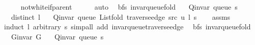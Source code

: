 \begin{isabellebody}
\ \ \ \ \isamarkupfalse%
\ not{\isacharunderscore}{\kern0pt}white{\isacharunderscore}{\kern0pt}if{\isacharunderscore}{\kern0pt}parent\isanewline
\ \ \ \ \isamarkupfalse%
\ auto\isanewline
{}\isamarkupfalse%
%
\endisatagproof
{\isafoldproof}%
%
\isadelimproof
\isanewline
%
\endisadelimproof
%
\isadeliminvisible
\isanewline
%
\endisadeliminvisible
%
\isataginvisible
{}\isamarkupfalse%
\ {\isacharparenleft}{\kern0pt}\ bfs{\isacharparenright}{\kern0pt}\ invar{\isacharunderscore}{\kern0pt}queue{\isacharunderscore}{\kern0pt}fold{\isacharcolon}{\kern0pt}\isanewline
\ \ \ {\isachardoublequoteopen}Q{\isacharunderscore}{\kern0pt}invar\ {\isacharparenleft}{\kern0pt}queue\ s{\isacharparenright}{\kern0pt}{\isachardoublequoteclose}\isanewline
\ \ \ {\isachardoublequoteopen}distinct\ l{\isachardoublequoteclose}\isanewline
\ \ \ {\isachardoublequoteopen}Q{\isacharunderscore}{\kern0pt}invar\ {\isacharparenleft}{\kern0pt}queue\ {\isacharparenleft}{\kern0pt}List{\isachardot}{\kern0pt}fold\ {\isacharparenleft}{\kern0pt}traverse{\isacharunderscore}{\kern0pt}edge\ src\ u{\isacharparenright}{\kern0pt}\ l\ s{\isacharparenright}{\kern0pt}{\isacharparenright}{\kern0pt}{\isachardoublequoteclose}%
\endisataginvisible
{\isafoldinvisible}%
%
\isadeliminvisible
\isanewline
%
\endisadeliminvisible
%
\isadelimproof
\ \ %
\endisadelimproof
%
\isatagproof
{}\isamarkupfalse%
\ assms\isanewline
\ \ \isamarkupfalse%
\ {\isacharparenleft}{\kern0pt}induct\ l\ arbitrary{\isacharcolon}{\kern0pt}\ s{\isacharparenright}{\kern0pt}\ {\isacharparenleft}{\kern0pt}simp{\isacharunderscore}{\kern0pt}all\ add{\isacharcolon}{\kern0pt}\ invar{\isacharunderscore}{\kern0pt}queue{\isacharunderscore}{\kern0pt}traverse{\isacharunderscore}{\kern0pt}edge{\isacharparenright}{\kern0pt}%
\endisatagproof
{\isafoldproof}%
%
\isadelimproof
\isanewline
%
\endisadelimproof
%
\isadeliminvisible
\isanewline
%
\endisadeliminvisible
%
\isataginvisible
{}\isamarkupfalse%
\ {\isacharparenleft}{\kern0pt}\ bfs{\isacharparenright}{\kern0pt}\ invar{\isacharunderscore}{\kern0pt}queue{\isacharunderscore}{\kern0pt}fold{\isacharunderscore}{\kern0pt}{}{\isacharcolon}{\kern0pt}\isanewline
\ \ \ {\isachardoublequoteopen}G{\isachardot}{\kern0pt}invar\ G{\isachardoublequoteclose}\isanewline
\ \ \ {\isachardoublequoteopen}Q{\isacharunderscore}{\kern0pt}invar\ {\isacharparenleft}{\kern0pt}queue\ s{\isacharparenright}{\kern0pt}{\isachardoublequoteclose}\isanewline

\end{isabellebody}
